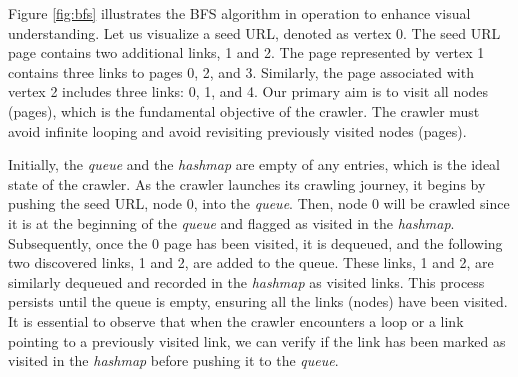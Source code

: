 Figure \ref{fig:bfs} illustrates the BFS algorithm in operation to enhance visual understanding. Let us visualize a seed URL, denoted as vertex 0. The seed URL page contains two additional links, 1 and 2. The page represented by vertex 1 contains three links to pages 0, 2, and 3. Similarly, the page associated with vertex 2 includes three links: 0, 1, and 4. Our primary aim is to visit all nodes (pages), which is the fundamental objective of the crawler. The crawler must avoid infinite looping and avoid revisiting previously visited nodes (pages).

Initially, the \textit{queue} and the \textit{hashmap} are empty of any entries, which is the ideal state of the crawler. As the crawler launches its crawling journey, it begins by pushing the seed URL, node 0, into the \textit{queue}. Then, node 0 will be crawled since it is at the beginning of the \textit{queue} and flagged as visited in the \textit{hashmap}. Subsequently, once the 0 page has been visited, it is dequeued, and the following two discovered links, 1 and 2, are added to the queue. These links, 1 and 2, are similarly dequeued and recorded in the \textit{hashmap} as visited links. This process persists until the queue is empty, ensuring all the links (nodes) have been visited. It is essential to observe that when the crawler encounters a loop or a link pointing to a previously visited link, we can verify if the link has been marked as visited in the \textit{hashmap} before pushing it to the \textit{queue}.

